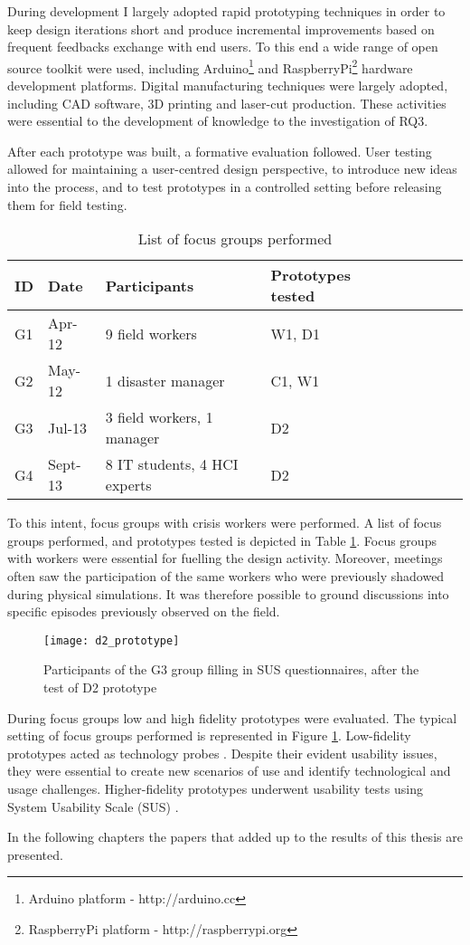 During development I largely adopted rapid prototyping techniques in order to keep design iterations short and produce incremental improvements based on frequent feedbacks exchange with end users. To this end a wide range of open source toolkit were used, including Arduino\footnote{Arduino platform - http://arduino.cc} and RaspberryPi\footnote{RaspberryPi platform - http://raspberrypi.org} hardware development platforms. Digital manufacturing techniques were largely adopted, including CAD software, 3D printing and laser-cut production. These activities were essential to the development of knowledge to the investigation of RQ3. 

After each prototype was built, a formative evaluation followed. User testing allowed for maintaining a user-centred design perspective, to introduce new ideas into the process, and to test prototypes in a controlled setting before releasing them for field testing.

\begin{table}
	[h] \centering \caption{List of focus groups performed} \label{labtests} 
	\begin{tabular}
		{@{}lllllllll@{}} \toprule 
		ID & Date & Participants & Prototypes tested \\
		\midrule 
		G1 & Apr-12 & 9 field workers & W1, D1 \\
		G2 & May-12 & 1 disaster manager & C1, W1 \\
		G3 & Jul-13 & 3 field workers, 1 manager & D2 \\
		G4 & Sept-13 & 8 IT students, 4 HCI experts & D2 \\
		\bottomrule 
	\end{tabular}
\end{table}

To this intent, focus groups with crisis workers were performed. A list of focus groups performed, and prototypes tested is depicted in Table \ref{labtests}. Focus groups with workers were essential for fuelling the design activity. Moreover, meetings often saw the participation of the same workers who were previously shadowed during physical simulations. It was therefore possible to ground discussions into specific episodes previously observed on the field.

\begin{figure}
	[tbh] \centering 
	\texttt{[image: d2\_prototype]} \caption{Participants of the G3 group filling in SUS questionnaires, after the test of D2 prototype} \label{fig:focus-group} 
\end{figure}

During focus groups low and high fidelity prototypes were evaluated. The typical setting of focus groups performed is represented in Figure \ref{fig:focus-group}. Low-fidelity prototypes acted as technology probes \autocite{Hutchinson:2003il}. Despite their evident usability issues, they were essential to create new scenarios of use and identify technological and usage challenges. Higher-fidelity prototypes underwent usability tests \autocite{Dumas:2009th} using System Usability Scale (SUS) \autocite[page 189]{jordan1996usability}.

In the following chapters the papers that added up to the results of this thesis are presented.